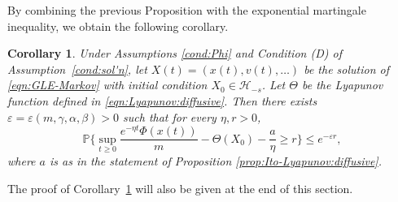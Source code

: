 \documentclass[11pt]{amsart}
\theoremstyle{definition}
\renewcommand{\H}{\mathcal{H}}
\newcommand{\Pnone}{\mathbb{P}}
\theoremstyle{definition}
\theoremstyle{plain}
\newtheorem{corollary}[theorem]{Corollary}
\numberwithin{equation}{section}
\begin{document}
By combining the previous Proposition with the exponential martingale inequality, we obtain the following corollary.    
\begin{corollary} \label{cor:exp-g} Under Assumptions \ref{cond:Phi} and Condition \emph{(D)} of Assumption~\ref{cond:sol'n}, let $X(t)=(x(t), v(t),  \ldots)$ be the solution of \eqref{eqn:GLE-Markov} with initial condition $X_0\in \H_{-s}$. Let $\Theta$ be the Lyapunov function defined in \eqref{eqn:Lyapunov:diffusive}. Then there exists $\varepsilon=\varepsilon(m,\gamma,\alpha,\beta)>0$ such that for every $\eta,r>0$, 
\begin{equation} \label{ineq:exp-g-1}
\Pnone \Big\{\sup_{t\geq 0}\frac{e^{-\eta t}\Phi(x(t))}{m}-\Theta(X_0)-\frac{a}{\eta}\geq r \Big\} \leq e^{-\varepsilon r},
\end{equation}
where $a$ is as in the statement of Proposition \ref{prop:Ito-Lyapunov:diffusive}.
\end{corollary}
\noindent The proof of Corollary~\ref{cor:exp-g} will also be given at the end of this section.  
\end{document}
